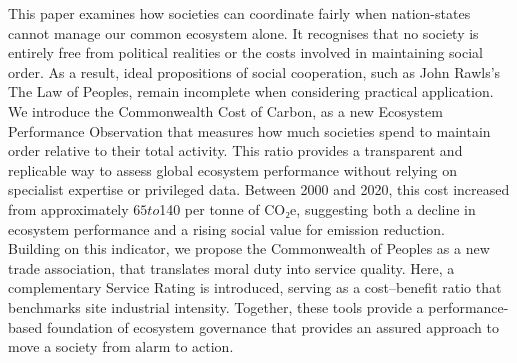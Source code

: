 This paper examines how societies can coordinate fairly when nation-states cannot manage our common ecosystem alone.
It recognises that no society is entirely free from political realities or the costs involved in maintaining social order.
As a result, ideal propositions of social cooperation, such as John Rawls’s The Law of Peoples, remain incomplete when considering practical application.\\

We introduce the Commonwealth Cost of Carbon, as a new Ecosystem Performance Observation that measures how much societies spend to maintain order relative to their total activity.
This ratio provides a transparent and replicable way to assess global ecosystem performance without relying on specialist expertise or privileged data.
Between 2000 and 2020, this cost increased from approximately $65 to $140 per tonne of CO₂e, suggesting both a decline in ecosystem performance and a rising social value for emission reduction.\\

Building on this indicator, we propose the Commonwealth of Peoples as a new trade association, that translates moral duty into service quality.
Here, a complementary Service Rating is introduced, serving as a cost–benefit ratio that benchmarks site industrial intensity.
Together, these tools provide a performance-based foundation of ecosystem governance that provides an assured approach to move a society from alarm to action.\\
